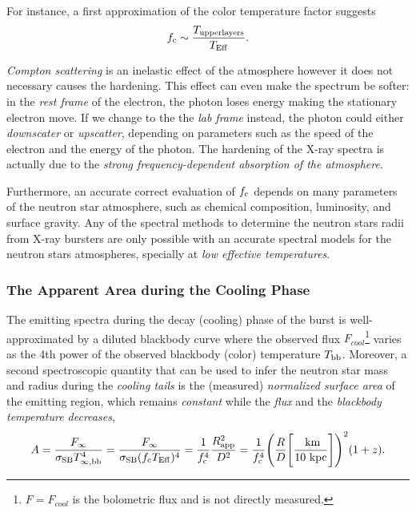 {\quad



For instance, a first approximation of the color temperature factor suggests
$$f_{\rm c} \sim \frac{T_{{\rm upper layers}}}{T_{\rm Eff}} .$$

\quad

 {\it Compton scattering} is an inelastic effect of the atmosphere however it does not necessary causes the hardening. This effect can even make the spectrum be softer: in the {\it rest frame} of the electron, the photon loses energy making the stationary electron move. If we change to the the {\it lab frame} instead, the photon could either {\it downscater} or {\it upscatter}, depending on parameters such as the speed of the electron and the energy of the photon. The hardening of the X-ray spectra is actually  due to the  {\it strong frequency-dependent absorption of the atmosphere}.

\quad



Furthermore, an accurate correct evaluation of $f_{\rm c}$ depends on many parameters of the neutron star atmosphere, such as  chemical composition, luminosity, and surface gravity. 
Any of the spectral methods to determine the neutron stars radii from X-ray bursters are only possible with an accurate spectral models for the neutron stars  atmospheres, specially at  {\it low effective temperatures}.

\quad




\subsubsection*{The Apparent Area during the Cooling Phase}

  The emitting spectra during the decay (cooling) phase of the burst is  well-approximated by a diluted blackbody curve where the observed flux $F_{cool}$\footnote{ $F=F_{cool}$ is the bolometric flux and is not directly measured.} varies as the 4th power of the observed blackbody (color) temperature $T_{\rm bb}$.  Moreover, a second spectroscopic quantity that can be used to infer the neutron star mass and radius during the {\it cooling tails} is the (measured) {\it normalized surface area} of the emitting region,  which  remains {\it constant}  while the {\it flux} and the {\it blackbody  temperature decreases},
\begin{equation}
A=  \frac{  F_{\infty  }}{\sigma_{\rm SB} T_{\infty,\rm bb}^4} = \frac{F_{\infty  }}{\sigma_{\rm SB}(f_{\rm c} T_{\rm Eff})^4}= \frac{1}{f_{\rm c}^4}\frac{R^2_{\rm app}}{D^2} = \frac{1}{f_{\rm c}^4} \Bigg(\frac{R}{ D} \Bigg[\frac{\mbox{ km}}{10\mbox{ kpc}}\Bigg] \Bigg)^2  (1+z).
\label{A}
\end{equation}

}
